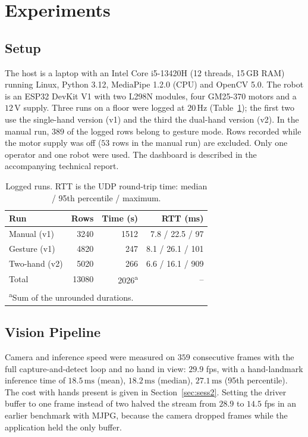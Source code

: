 \documentclass[5p,twocolumn]{elsarticle}
\begin{document}
\section{Experiments}\label{sec:experiments}
\subsection{Setup}\label{sec:setup}
The host is a laptop with an Intel Core i5-13420H (12 threads, 15\,GB RAM) running Linux, Python 3.12, MediaPipe 1.2.0 (CPU) and OpenCV 5.0. The robot is an ESP32 DevKit V1 with two L298N modules, four GM25-370 motors and a $12\,\mathrm{V}$ supply. Three runs on a floor were logged at $20\,\mathrm{Hz}$ (Table~\ref{tab:data}); the first two use the single-hand version (v1) and the third the dual-hand version (v2). In the manual run, $389$ of the logged rows belong to gesture mode. Rows recorded while the motor supply was off ($53$ rows in the manual run) are excluded. Only one operator and one robot were used. The dashboard is described in the accompanying technical report.

\begin{table}[!t]
\caption{Logged runs. RTT is the UDP round-trip time: median / 95th percentile / maximum.}
\label{tab:data}
\centering
\small
\begin{tabular}{lrrr}
\toprule
Run & Rows & Time (s) & RTT (ms) \\
\midrule
Manual (v1)   & 3240 & 1512 & 7.8 / 22.5 / 97 \\
Gesture (v1)  & 4820 &  247 & 8.1 / 26.1 / 101 \\
Two-hand (v2) & 5020 &  266 & 6.6 / 16.1 / 909 \\
\midrule
Total & 13080 & 2026\textsuperscript{a} & -- \\
\bottomrule
\multicolumn{4}{l}{\footnotesize\textsuperscript{a}Sum of the unrounded durations.}
\end{tabular}
\end{table}

\subsection{Vision Pipeline}\label{sec:vision}
Camera and inference speed were measured on $359$ consecutive frames with the full capture-and-detect loop and no hand in view: $29.9$ fps, with a hand-landmark inference time of $18.5\,\mathrm{ms}$ (mean), $18.2\,\mathrm{ms}$ (median), $27.1\,\mathrm{ms}$ (95th percentile). The cost with hands present is given in Section~\ref{sec:sess2}. Setting the driver buffer to one frame instead of two halved the stream from $28.9$ to $14.5$ fps in an earlier benchmark with MJPG, because the camera dropped frames while the application held the only buffer.
\end{document}
